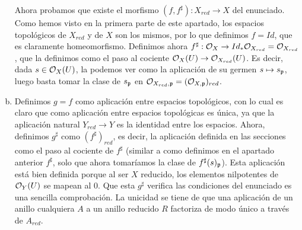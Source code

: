 \documentclass[twoside]{article}
\begin{document}
\begin{solucion}
\begin{enumerate}[(a)]
Ahora probamos que existe el morfismo $(f,f^{\sharp}):X_{red}\to X$ del enunciado. Como hemos visto en la primera parte de este apartado, los espacios topológicos de $X_{red}$ y de $X$ son los mismos, por lo que definimos $f=Id$, que es claramente homeomorfismo. Definimos ahora $f^{\sharp}:{\mathcal O}_{X}\to Id_*{\mathcal O}_{X_{red}}={\mathcal O}_{X_{red}}$, que la definimos como el paso al cociente ${\mathcal O}_{X}(U)\to{\mathcal O}_{X_{red}}(U)$. Es decir, dada $s\in {\mathcal O}_X(U)$, la podemos ver como la aplicación de su germen $s\mapsto s_{\mathfrak{p}}$, luego basta tomar la clase de $s_{\mathfrak{p}}$ en ${\mathcal O}_{X_{red}, \mathfrak{p}}=({\mathcal O}_{X,\mathfrak{p}})_{red}$.

\item Definimos $g=f$ como aplicación entre espacios topológicos, con lo cual es claro que como aplicación entre espacios topológicas es única, ya que la aplicación natural $Y_{red}\to Y$ es la identidad entre los espacios. Ahora, definimos $g^{\sharp}$ como $(f^{\sharp})_{red}$, es decir, la aplicación definida en las secciones como el paso al cociente de $f^{\sharp}$ (similar a como definimos en el apartado anterior $f^{\sharp}$, solo que ahora tomaríamos la clase de $f^{\sharp}(s)_{\mathfrak{p}}$). Esta aplicación está bien definida porque al ser $X$ reducido, los elementos nilpotentes de ${\mathcal O}_Y(U)$ se mapean al 0. Que esta $g^{\sharp}$ verifica las condiciones del enunciado es una sencilla comprobación. La unicidad se tiene de que una aplicación de un anillo cualquiera $A$ a un anillo reducido $R$ factoriza de modo único a través de $A_{red}$. 
\end{enumerate}
\end{solucion}

\newpage
\end{document}
